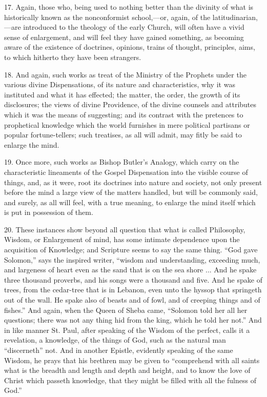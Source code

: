 17. Again, those who, being used to nothing better than the
divinity of what is historically known as the nonconformist school,—or,
again, of the latitudinarian,—are introduced to the theology of the
early Church, will often have a vivid sense of enlargement, and will
feel they have gained something, as becoming aware of the existence of
doctrines, opinions, trains of thought, principles, aims, to which
hitherto they have been strangers.

18. And again, such works as treat of the Ministry of the Prophets
under the various divine Dispensations, of its nature and
characteristics, why it was instituted and what it has effected; the
matter, the order, the growth of its disclosures; the views of divine
Providence, of the divine counsels and attributes which it was the
means of suggesting; and its contrast with the pretences to
prophetical knowledge which the world furnishes in mere political
partisans or popular fortune-tellers; such treatises, as all will
admit, may fitly be said to enlarge the mind.

19. Once more, such works as Bishop Butler's Analogy, which carry
on the characteristic lineaments of the Gospel Dispensation into the
visible course of things, and, as it were, root its doctrines into
nature and society, not only present before the mind a large view of
the matters handled, but will be commonly said, and surely, as all
will feel, with a true meaning, to enlarge the mind itself which is
put in possession of them.

20. These instances show beyond all question that what is called
Philosophy, Wisdom, or Enlargement of mind, has some intimate
dependence upon the acquisition of Knowledge; and Scripture seems to
say the same thing. ``God gave Solomon,'' says the inspired
writer, ``wisdom and understanding, exceeding much, and largeness
of heart even as the sand that is on the sea shore ... And he spake
three thousand proverbs, and his songs were a thousand and five. And
he spake of trees, from the cedar-tree that is in Lebanon, even unto
the hyssop that springeth out of the wall. He spake also of beasts and
of fowl, and of creeping things and of fishes.'' And again, when
the Queen of Sheba came, ``Solomon told her all her questions;
there was not any thing hid from the king, which he told her
not.'' And in like manner St. Paul, after speaking of the Wisdom
of the perfect, calls it a revelation, a knowledge, of the things of
God, such as the natural man ``discerneth'' not. And in
another Epistle, evidently speaking of the same Wisdom, he prays that
his brethren may be given to ``comprehend with all saints what is
the breadth and length and depth and height, and to know the love of
Christ which passeth knowledge, that they might be filled with all the
fulness of God.''

